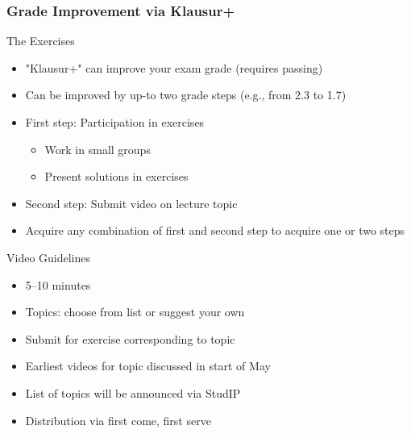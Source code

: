 \begin{frame}
	\frametitle{Grade Improvement via Klausur+}

	\begin{fancycolumns}[widths={55}]
		\begin{definition}{The Exercises}
			\begin{itemize}
				\item "Klausur+" can improve your exam grade (requires passing)
				\item Can be improved by up-to two grade steps (e.g., from 2.3 to 1.7)
				\item First step: Participation in exercises
				\begin{itemize}
					\item Work in small groups
					\item Present solutions in exercises
				\end{itemize}
				\item Second step: Submit video on lecture topic
				\item Acquire any combination of first and second step to acquire one or two steps
			\end{itemize}
		\end{definition}
		\nextcolumn
		\begin{definition}{Video Guidelines}
			\begin{itemize}
				\item 5--10 minutes
				\item Topics: choose from list or suggest your own
				\item Submit for exercise corresponding to topic
				\item Earliest videos for topic discussed in start of May
				\item List of topics will be announced via StudIP
				\item Distribution via first come, first serve
			\end{itemize}
		\end{definition}
	\end{fancycolumns}

\end{frame}

